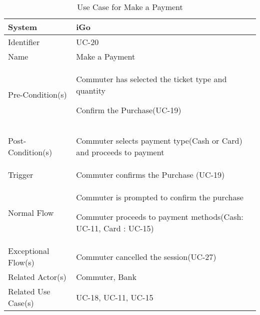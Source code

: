 \begin{table}[ht]
    \centering
    \begin{tabular}{|l|p{11cm}|}
        \hline
        System             & iGo\\
        \hline
        Identifier         & UC-20 \\
        \hline
        Name               & Make a Payment \\
        Pre-Condition(s)   & 
        \begin{enumerate*}[itemjoin=\newline]
            \item Commuter has selected the ticket type and quantity 
            \item Confirm the Purchase(UC-19)
        \end{enumerate*} \\
        \hline
        Post-Condition(s)  & 
        \begin{enumerate*}[itemjoin=\newline]
            \item Commuter selects payment type(Cash or Card) and proceeds to payment
        \end{enumerate*} \\
        \hline
        Trigger            & Commuter confirms the Purchase (UC-19)\\
        \hline
        Normal Flow        & 
        \begin{enumerate*}[itemjoin=\newline]
            \item Commuter is prompted to confirm the purchase 
            \item Commuter proceeds to payment methods(Cash: UC-11, Card : UC-15)
        \end{enumerate*} \\
        \hline
        Exceptional Flow(s) & Commuter cancelled the session(UC-27) \\
        \hline
         Related Actor(s)   &  Commuter, Bank \\
        \hline
        Related Use Case(s)& UC-18, UC-11, UC-15\\
        \hline
    \end{tabular}
    \caption{Use Case for Make a Payment}
    \label{tab:UC_MakePayment}
\end{table}

